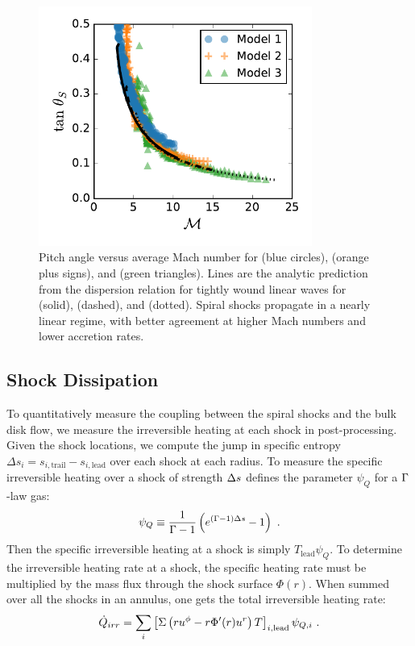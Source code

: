 \begin{figure}
\begin{center}
\includegraphics[width=0.8\textwidth]{figures/minidisk/q011_all_tanq_mach.pdf}
\end{center}
\caption{ Pitch angle versus average Mach number for  (blue circles),  (orange plus signs), and  (green triangles). Lines are the analytic prediction from the dispersion relation for tightly wound linear waves for  (solid),  (dashed), and  (dotted).  Spiral shocks propagate in a nearly linear regime, with better agreement at higher Mach numbers and lower accretion rates.}
\end{figure}


\subsection{Shock Dissipation}

To quantitatively measure the coupling between the spiral shocks and the bulk disk flow, we measure the irreversible heating at each shock in post-processing.  Given the shock locations, we compute the jump in specific entropy $\Delta s_i = s_{i,\text{trail}} - s_{i,\text{lead}}$ over each shock at each radius.  To measure the specific irreversible heating over a shock of strength $\Delta s$ \cite{Rafikov16} defines the parameter $\psi_Q$ for a $\Gamma$-law gas:
\begin{equation}
	\psi_Q \equiv \frac{1}{\Gam - 1} \left( e^{(\Gam -1)\De s } - 1 \right) \ . \eqlabel{def-psi}
\end{equation}
Then the specific irreversible heating at a shock is simply $T_\text{lead} \psi_Q$.  To determine the irreversible heating rate at a shock, the specific heating rate must be multiplied by the mass flux through the shock surface $\Phi(r)$.  When summed over all the shocks in an annulus, one gets the total irreversible heating rate:
\begin{equation}
	\dot{Q}_{irr} = \sum_i \left[ \Sigma \left(r u^\phi - r \Phi'(r) u^r \right) T \right]_{i,\text{lead}} \psi_{Q,i} \ . \eqlabel{QirrRaf}
\end{equation}

